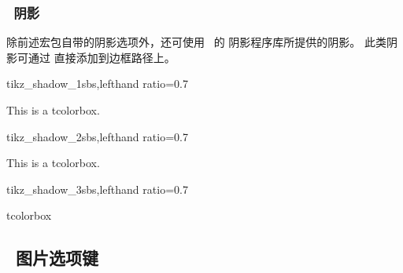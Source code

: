 \clearpage
\subsubsection{\tikzname\ 阴影}
除前述宏包自带的阴影选项外，还可使用 \tikzname\ 的
\flqq 阴影程序库\frqq 所提供的阴影。
此类阴影可通过  直接添加到边框路径上。

\begin{exdispExample*}{tikz_shadow_1}{sbs,lefthand ratio=0.7}
\begin{tcolorbox}[enhanced,
  colback=red!5!white,colframe=red!75!black,
  frame style={drop shadow} ]
  This is a tcolorbox.
\end{tcolorbox}
\end{exdispExample*}

\begin{exdispExample*}{tikz_shadow_2}{sbs,lefthand ratio=0.7}
\begin{tcolorbox}[enhanced,height=3cm,
  colback=red!5!white,colframe=red!75!black,
  halign=center,valign=center,
  frame style={circular drop shadow} ]
  This is a tcolorbox.
\end{tcolorbox}
\end{exdispExample*}

\begin{exdispExample*}{tikz_shadow_3}{sbs,lefthand ratio=0.7}
\begin{tcolorbox}[enhanced,width=2.5cm,
  square,circular arc,
  halign=center,valign=center,
  colback=red!5!white,colframe=red!75!black,
  frame style={circular glow={fill=red}} ]
  tcolorbox
\end{tcolorbox}
\end{exdispExample*}


\clearpage
\subsection{\tikzname\ 图片选项键}\label{subsec:tikzpicture}

